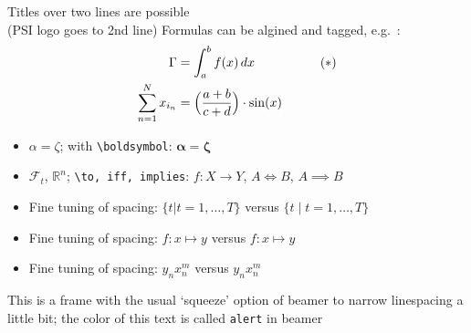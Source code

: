 \documentclass[aspectratio=169,smaller]{beamer}
\begin{document}
\begin{frame}[squeeze]{Titles over two lines are possible\\
    (PSI logo goes to 2nd line)}
  Formulas can be algined and tagged, e.g.\ \thetag{$\ast$}:
  \begin{align*}
    \Gamma  & = \int_a^b f(x)\,dx             && \tag{$\ast$}\\
    \sum_{n=1}^N x_{i_n} &= \Bigl(\frac{a+b}{c+d}\Bigr)\cdot \sin(x)  &&
  \end{align*}
  \begin{itemize}
  \item  $\alpha = \zeta$; with \texttt{\textbackslash boldsymbol}: $\boldsymbol{\alpha} = \boldsymbol{\zeta}$ 
  \item $\mathcal{F}_t$, $\mathbb{R}^n$;  \texttt{\textbackslash to, iff, implies}: $f\colon X\to Y$, $A\iff B$, $A\implies B$
  \item Fine tuning of spacing: $\{t | t=1,\dots,T\}$ versus  $\{t \mid t=1,\dots,T\}$
  \item Fine tuning of spacing: $f: x\mapsto y$ versus $f\colon x\mapsto y$
  \item Fine tuning of spacing: $y_n x_n^m$ versus $y_n^{}x_n^m$
  \end{itemize}
   \alert{This is a frame with the usual `squeeze' option of beamer to narrow linespacing a little bit; the color of this text is called \texttt{alert} in beamer}
  
\end{frame}
\end{document}

